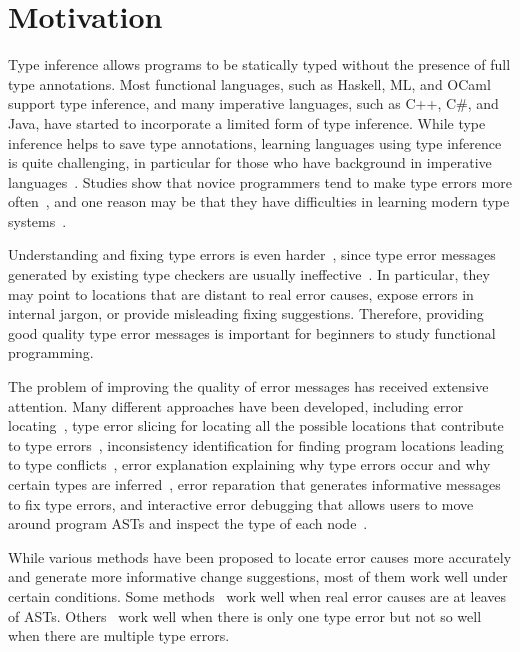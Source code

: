 \documentclass[12pt]{report}	%
\begin{document}
\section{Motivation}

%
Type inference allows programs to be statically typed without
the presence of full type annotations. Most functional languages,
such as Haskell, ML, and OCaml support type inference, and many
imperative languages, such as C++, C\#, and Java, have started to
incorporate a limited form of type inference.
While type inference helps to save type annotations, learning languages
using type inference is quite challenging,
in particular for those who have background in imperative languages~\cite{clack1995dys,joosten1993teaching}.
Studies show that novice programmers tend to make type errors more often~\cite{chambers2012function,Heeren05:TQT,hage2006mining,tirronen2015understanding}, and
one reason may be that they have difficulties in learning modern type systems~\cite{clack1995dys,chakravarty2004risks}.


Understanding and fixing type errors is even harder~\cite{marceau2011measuring,marceau2011mind,tirronen2015understanding},
since type error messages generated by existing type checkers are usually ineffective~\cite{marceau2011mind}.
In particular, they may point to locations that are distant to real error causes,
expose errors in internal jargon, or provide misleading fixing suggestions.
Therefore, providing good quality type error messages
is important for beginners to study functional programming.

The problem of improving the quality of error messages has received
extensive attention. Many different approaches have been developed,
including error locating~\cite{Mcadam98:UST,Eo04:PSH,Zhang15:DTE,Pavlinovic14:FMT},
type error slicing for locating all the possible locations that
contribute to type errors~\cite{Schilling12:CFT,Haack03:TES},
inconsistency identification for finding program locations leading to
type conflicts~\cite{Yang00:ETE,Wazny06:TIT},
error explanation explaining why type errors occur and why certain
types are inferred~\cite{Chitil01:CET,jun2002explaining,Loncaric16:PFT},
error reparation that generates informative messages to fix type errors,
and interactive error debugging that allows users to move around
program ASTs and inspect the type of each node~\cite{Brassel04:TH,Chitil01:CET}.


While various methods have been proposed to locate
error causes more accurately and 
generate more informative change suggestions,
most of them work well under certain conditions.
Some methods~\cite{CE14popl,CE14flops,Zhang14:tgd}
work well when real error causes are
at leaves of ASTs. Others~\cite{Lerner06:SSM,Pavlinovic15:PST}
work well when there is only one type error but
not so well when there are multiple type errors.
\end{document}
